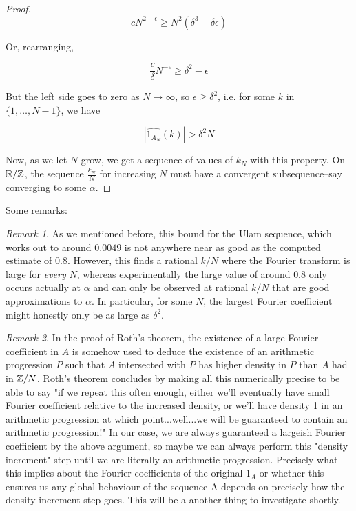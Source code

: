 \documentclass{article}
\theoremstyle{definition}
\theoremstyle{remark}
\newtheorem{remark}{Remark}
\numberwithin{equation}{section}
\begin{document}
{\begin{proof}
\[cN^{2-\epsilon} \geq N^2 (\delta^3 - \delta\epsilon)\]

Or, rearranging, 

\[\frac{c}{\delta} N^{-\epsilon} \geq \delta^2 - \epsilon\]

But the left side goes to zero as $N \to \infty$, so
$\epsilon \geq \delta^2$, i.e. for some $k$ in $\{1, \ldots, N-1\}$,
we have

\[|\widehat{1_{A_N}}(k)| > \delta^2 N\]

Now, as we let $N$ grow, we get a sequence of values of $k_N$ with
this property.  On $\mathbb{R}/\mathbb{Z}$, the sequence $\frac{k_N}{N}$ for
increasing $N$ must have a convergent subsequence--say converging to
some $\alpha$.  \end{proof}

Some remarks: 

\begin{remark}
  As we mentioned before, this bound for the Ulam sequence, which
  works out to around $0.0049$ is not anywhere near as good as the
  computed estimate of $0.8$.  However, this finds a rational $k/N$
  where the Fourier transform is large for \textit{every} $N$, whereas
  experimentally the large value of around $0.8$ only occurs actually
  at $\alpha$ and can only be observed at rational $k/N$ that are good
  approximations to $\alpha$.  In particular, for some $N$, the
  largest Fourier coefficient might honestly only be as large as
  $\delta^2$.
\end{remark}

\begin{remark}
  In the proof of Roth's theorem, the existence of a large Fourier
  coefficient in $A$ is somehow used to deduce the existence of an
  arithmetic progression $P$ such that $A$ intersected with $P$ has
  higher density in $P$ than $A$ had in $\mathbb{Z}/N$.  Roth's theorem
  concludes by making all this numerically precise to be able to say
  "if we repeat this often enough, either we'll eventually have small
  Fourier coefficient relative to the increased density, or we'll have
  density 1 in an arithmetic progression at which point...well...we
  will be guaranteed to contain an arithmetic progression!"  In our
  case, we are always guaranteed a largeish Fourier coefficient by the
  above argument, so maybe we can always perform this "density
  increment" step until we are literally an arithmetic progression.
  Precisely what this implies about the Fourier coefficients of the
  original $1_A$ or whether this ensures us any global behaviour of
  the sequence A depends on precisely how the density-increment step
  goes.  This will be a another thing to investigate shortly.
\end{remark}

}
\end{document}
